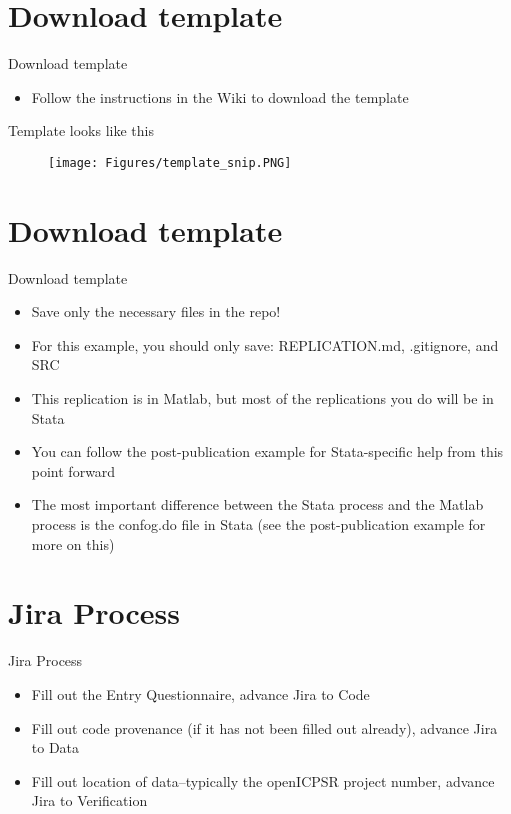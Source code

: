 \documentclass[xcolor={dvipsnames}]{beamer}
\theoremstyle{definition}
\begin{document}
\section{Download template}
\begin{frame}{Download template}
\begin{itemize}
    \item Follow the instructions in the Wiki to download the template
\end{itemize}
\end{frame}

\begin{frame}{Template looks like this}
\begin{figure}
    \centering
    \texttt{[image: Figures/template\_snip.PNG]}
\end{figure}
\end{frame}

\section{Download template}
\begin{frame}{Download template}
\begin{itemize}
    \item Save only the necessary files in the repo!
    \item For this example, you should only save: REPLICATION.md, .gitignore, and SRC
    \item This replication is in Matlab, but most of the replications you do will be in Stata
    \item You can follow the post-publication example for Stata-specific help from this point forward
    \item The most important difference between the Stata process and the Matlab process is the confog.do file in Stata (see the post-publication example for more on this)
\end{itemize}
\end{frame}

\section{Jira Process}
\begin{frame}{Jira Process}
\begin{itemize}
    \item Fill out the Entry Questionnaire, advance Jira to Code
    \item Fill out code provenance (if it has not been filled out already), advance Jira to Data
    \item Fill out location of data--typically the openICPSR project number, advance Jira to Verification
\end{itemize}
\end{frame}
\end{document}
